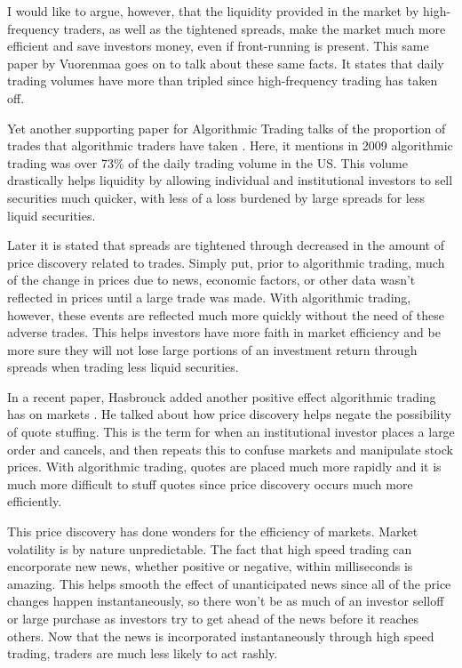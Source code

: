 \documentclass[11pt,]{article}
\begin{document}
I would like to argue, however, that the liquidity provided in the
market by high-frequency traders, as well as the tightened spreads, make
the market much more efficient and save investors money, even if
front-running is present. This same paper by Vuorenmaa goes on to talk
about these same facts. It states that daily trading volumes have more
than tripled since high-frequency trading has taken off.

Yet another supporting paper for Algorithmic Trading talks of the
proportion of trades that algorithmic traders have taken
\citet{hendershott2011does}. Here, it mentions in 2009 algorithmic
trading was over 73\% of the daily trading volume in the US. This volume
drastically helps liquidity by allowing individual and institutional
investors to sell securities much quicker, with less of a loss burdened
by large spreads for less liquid securities.

Later it is stated that spreads are tightened through decreased in the
amount of price discovery related to trades. Simply put, prior to
algorithmic trading, much of the change in prices due to news, economic
factors, or other data wasn't reflected in prices until a large trade
was made. With algorithmic trading, however, these events are reflected
much more quickly without the need of these adverse trades. This helps
investors have more faith in market efficiency and be more sure they
will not lose large portions of an investment return through spreads
when trading less liquid securities.

In a recent paper, Hasbrouck added another positive effect algorithmic
trading has on markets \citet{hasbrouck2018high}. He talked about how
price discovery helps negate the possibility of quote stuffing. This is
the term for when an institutional investor places a large order and
cancels, and then repeats this to confuse markets and manipulate stock
prices. With algorithmic trading, quotes are placed much more rapidly
and it is much more difficult to stuff quotes since price discovery
occurs much more efficiently.

This price discovery has done wonders for the efficiency of markets.
Market volatility is by nature unpredictable. The fact that high speed
trading can encorporate new news, whether positive or negative, within
milliseconds is amazing. This helps smooth the effect of unanticipated
news since all of the price changes happen instantaneously, so there
won't be as much of an investor selloff or large purchase as investors
try to get ahead of the news before it reaches others. Now that the news
is incorporated instantaneously through high speed trading, traders are
much less likely to act rashly.
\end{document}
